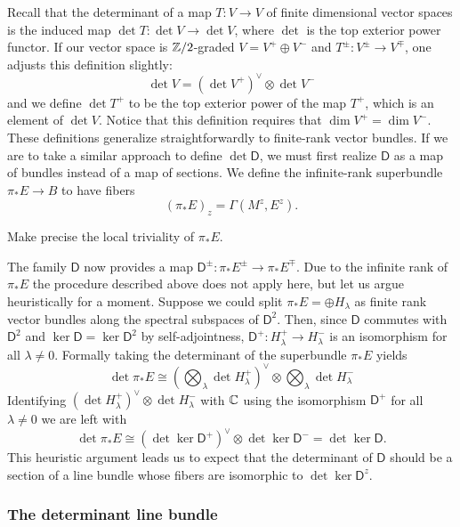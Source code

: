 \documentclass{amsart}
\renewcommand\d{\mathsf{D}}
\begin{document}
Recall that the determinant of a map $T:V\to V$ of finite dimensional vector spaces is
the induced map $\det T:\det V\to\det V$, where $\det$ is the top exterior power functor.
If our vector space
is $\mathbb{Z}/2$-graded $V=V^+\oplus V^-$ and $T^\pm:V^\pm\to V^\mp$, one adjusts this definition
slightly:
\begin{equation*}
    \det V = (\det V^+)^\vee \otimes \det V^-
\end{equation*}
and we define $\det T^+$ to be the top exterior power of the map $T^+$, which is an element
of $\det V$. Notice that this definition requires that $\dim V^+=\dim V^-$.
These definitions generalize straightforwardly to finite-rank vector bundles. 
If we are to take a similar approach to define $\det\d$, we must first realize $\d$ as
a map of bundles instead of a map of sections. We define the infinite-rank superbundle
$\pi_*E\to B$ to have fibers
\begin{equation*}
    (\pi_*E)_z = \Gamma(M^z, E^z).
\end{equation*}

\begin{exercise}
    Make precise the local triviality of $\pi_*E$.
\end{exercise}

The family $\d$ now provides a map $\d^\pm:\pi_*E^\pm\to\pi_*E^\mp$. Due to the infinite
rank of $\pi_*E$ the procedure described above does not apply here, but let us argue heuristically
for a moment. Suppose we could split $\pi_*E=\oplus H_\lambda$ as finite rank vector bundles
along the spectral subspaces of $\d^2$. Then, since $\d$ commutes with $\d^2$ and $\ker\d=\ker\d^2$
by self-adjointness, $\d^+:H_\lambda^+\to H_\lambda^-$ is an isomorphism for all $\lambda\neq0$.
Formally taking the determinant of the superbundle $\pi_*E$ yields
\begin{equation*}
    \det\pi_*E\cong(\bigotimes_\lambda\det H_\lambda^+)^\vee\otimes\bigotimes_\lambda\det H_\lambda^-
\end{equation*}
Identifying $(\det H_\lambda^+)^\vee\otimes\det H_\lambda^-$ with $\mathbb{C}$ using the isomorphism
$\d^+$ for all $\lambda\neq0$ we are left with
\begin{equation*}
    \det \pi_*E \cong (\det \ker \d^+)^\vee \otimes \det \ker \d^- = \det \ker \d.
\end{equation*}
This heuristic argument leads us to expect that the determinant of $\d$ should be a section of a
line bundle whose fibers are isomorphic to $\det\ker\d^z$.

\subsubsection{The determinant line bundle}
\end{document}

